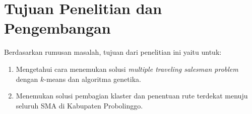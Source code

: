 \section{Tujuan Penelitian dan Pengembangan}

Berdasarkan rumusan masalah, tujuan dari penelitian ini yaitu untuk:
\begin{enumerate}
	\item Mengetahui cara menemukan solusi \textit{multiple traveling salesman problem} dengan $k$-means dan algoritma genetika.
	\item Menemukan solusi pembagian klaster dan penentuan rute terdekat menuju seluruh SMA di Kabupaten Probolinggo.
\end{enumerate}
